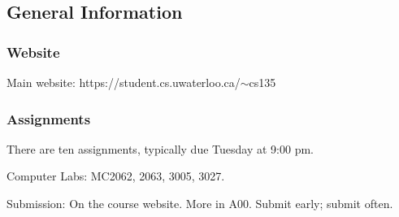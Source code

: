 \subsection{General Information}
\subsubsection{Website}
Main website: https://student.cs.uwaterloo.ca/$\sim$cs135

\subsubsection{Assignments}
There are ten assignments, typically due Tuesday at 9:00 pm. 

Computer Labs: MC2062, 2063, 3005, 3027. 

Submission: On the course website. More in A00. Submit early; submit often. 